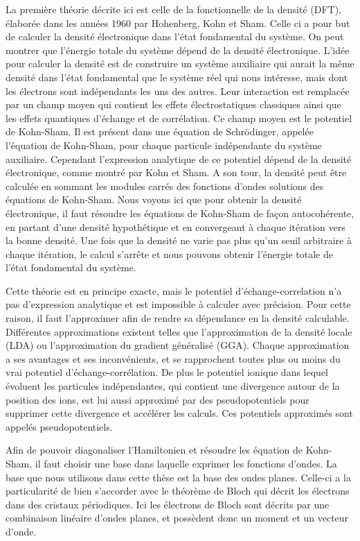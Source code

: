 La première théorie décrite ici est celle de la fonctionnelle de la densité (DFT), élaborée dans les années 1960 par Hohenberg, Kohn et Sham. Celle ci a pour but de calculer la densité électronique dans l'état fondamental du système. On peut montrer que l'énergie totale du système dépend de la densité électronique. L'idée pour calculer la densité est de construire un système auxiliaire qui aurait la même densité dans l'état fondamental que le système réel qui nous intéresse, mais dont les électrons sont indépendants les uns des autres. Leur interaction est remplacée par un champ moyen qui contient les effets électrostatiques classiques ainsi que les effets quantiques d'échange et de corrélation. Ce champ moyen est le potentiel de Kohn-Sham. Il est présent dans une équation de Schrödinger, appelée l'équation de Kohn-Sham, pour chaque particule indépendante du système auxiliaire. Cependant l'expression analytique de ce potentiel dépend de la densité électronique, comme montré par Kohn et Sham. A son tour, la densité peut être calculée en sommant les modules carrés des fonctions d'ondes solutions des équations de Kohn-Sham. Nous voyons ici que pour obtenir la densité électronique, il faut résoudre les équations de Kohn-Sham de façon autocohérente, en partant d'une densité hypothétique et en convergeant à chaque itération vers la bonne densité. Une fois que la densité ne varie pas plus qu'un seuil arbitraire à chaque itération, le calcul s'arrête et nous pouvons obtenir l'énergie totale de l'état fondamental du système.

Cette théorie est en principe exacte, mais le potentiel d'échange-correlation n'a pas d'expression analytique et est impossible à calculer avec précision. Pour cette raison, il faut l'approximer afin de rendre sa dépendance en la densité calculable. Différentes approximations existent telles que l'approximation de la densité locale (LDA) ou l'approximation du gradient généralisé (GGA). Chaque approximation a ses avantages et ses inconvénients, et se rapprochent toutes plus ou moins du vrai potentiel d'échange-corrélation. De plus le potentiel ionique dans lequel évoluent les particules indépendantes, qui contient une divergence autour de la position des ions, est lui aussi approximé par des pseudopotentiels pour supprimer cette divergence et accélérer les calculs. Ces potentiels approximés sont appelés pseudopotentiels. 

Afin de pouvoir diagonaliser l'Hamiltonien et résoudre les équation de Kohn-Sham, il faut choisir une base dans laquelle exprimer les fonctions d'ondes. La base que nous utilisons dans cette thèse est la base des ondes planes. Celle-ci a la particularité de bien s'accorder avec le théorème de Bloch qui décrit les électrons dans des cristaux périodiques. Ici les électrons de Bloch sont décrits par une combinaison linéaire d'ondes planes, et possèdent donc un moment et un vecteur d'onde.

